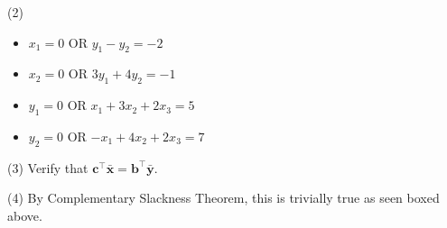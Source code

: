 (2)
\begin{itemize}
    \item $ x_1=0 $ OR $ \boxed{y_1-y_2=-2} $
    \item $ \boxed{x_2=0} $ OR $ 3y_1+4y_2=-1 $
    \item $ y_1=0 $ OR $ \boxed{x_1+3x_2+2x_3=5} $
    \item $ y_2=0 $ OR $ \boxed{-x_1+4x_2+2x_3=7} $
\end{itemize}

(3) Verify that $ \bm{c}^\top \bm{\bar{x}}=\bm{b}^\top \bm{\bar{y}} $.

(4) By Complementary Slackness Theorem, this is trivially true as seen boxed
above.
